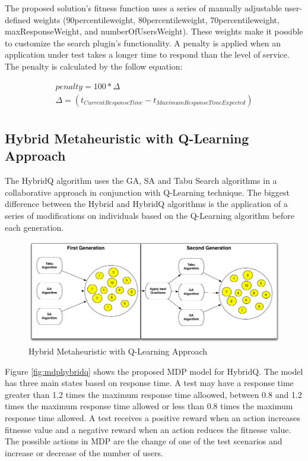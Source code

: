 The proposed solution's fitness function uses a series of manually adjustable user-defined weights (90percentileweight, 80percentileweight,  70percentileweight, maxResponseWeight, and numberOfUsersWeight). These weights make it possible to customize the search plugin's functionality. A penalty is applied when an application under test takes a longer time to respond than the level of service. The penalty is calculated by the follow equation:

\begin{equation}
\begin{aligned}
penalty=100 * \Delta \\
\Delta=(t_{Current Response Time} - t_{Maximum Response Time Expected})\\
\end{aligned}
\end{equation}

\subsection{Hybrid Metaheuristic with Q-Learning Approach}

The HybridQ algorithm uses the GA, SA and Tabu Search algorithms in a collaborative approach in conjunction with Q-Learning technique. The biggest difference between the Hybrid and HybridQ algorithms is the application of a series of modifications on individuals based on the Q-Learning algorithm before each generation.

\begin{figure}[h!]
\center
\includegraphics[width=1\textwidth]{./images/qhybrid.png}
\caption{Hybrid Metaheuristic with Q-Learning Approach}
\label{fig:hybridq}
\end{figure}

Figure \ref{fig:mdphybridq} shows the proposed MDP model for HybridQ. The model has three main states based on response time. A test may have a response time greater than 1.2 times the maximum response time alloowed, between 0.8 and 1.2 times the maximum response time allowed or less than 0.8 times the maximum response time allowed. A test receives a positive reward when an action increases fitnesse value and a negative reward when an action reduces the fitnesse value. The possible actions in MDP are the change of one of the test scenarios and increase or decrease of the number of users.

